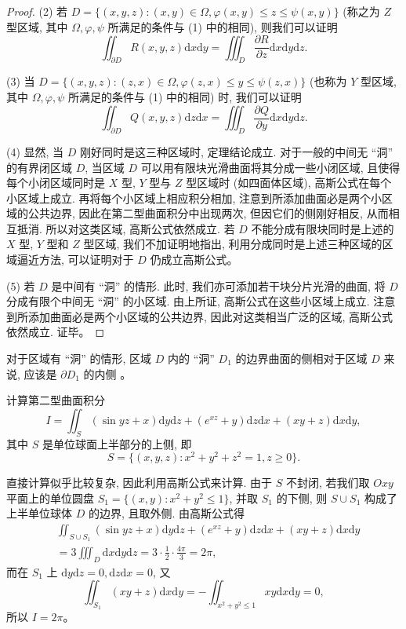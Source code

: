 \documentclass[12pt,fontset=fandol]{ctexart}
\begin{document}
\begin{proof}
(2) 若 $D=\{(x,y,z):(x,y)\in\Omega,\varphi(x,y)\leqslant z\leqslant\psi(x,y)\}$ (称之为 $Z$ 型区域, 其中 $\Omega,\varphi,\psi$ 所满足的条件与 (1) 中的相同), 则我们可以证明
\[
  \iint_{\partial D}R(x,y,z)\mathrm dx\mathrm dy
  =\iiint_D\frac{\partial R}{\partial z}\mathrm dx\mathrm dy\mathrm dz.
\]

(3) 当 $D=\{(x,y,z):(z,x)\in\Omega,\varphi(z,x)\leqslant y\leqslant\psi(z,x)\}$ (也称为 $Y$ 型区域, 其中 $\Omega,\varphi,\psi$ 所满足的条件与 (1) 中的相同) 时, 我们可以证明
\[
  \iint_{\partial D}Q(x,y,z)\mathrm dz\mathrm dx
  =\iiint_D\frac{\partial Q}{\partial y}\mathrm dx\mathrm dy\mathrm dz.
\]

(4) 显然, 当 $D$ 刚好同时是这三种区域时, 定理结论成立. 对于一般的中间无 ``洞'' 的有界闭区域 $D$, 当区域 $D$ 可以用有限块光滑曲面将其分成一些小闭区域, 且使得每个小闭区域同时是 $X$ 型, $Y$ 型与 $Z$ 型区域时 (如四面体区域), 高斯公式在每个小区域上成立. 再将每个小区域上相应积分相加, 注意到所添加曲面必是两个小区域的公共边界, 因此在第二型曲面积分中出现两次, 但因它们的侧刚好相反, 从而相互抵消. 所以对这类区域, 高斯公式依然成立. 若 $D$ 不能分成有限块同时是上述的 $X$ 型, $Y$ 型和 $Z$ 型区域, 我们不加证明地指出, 利用分成同时是上述三种区域的区域逼近方法, 可以证明对于 $D$ 仍成立高斯公式。

(5) 若 $D$ 是中间有 ``洞'' 的情形. 此时, 我们亦可添加若干块分片光滑的曲面, 将 $D$ 分成有限个中间无 ``洞'' 的小区域. 由上所证, 高斯公式在这些小区域上成立. 注意到所添加曲面必是两个小区域的公共边界, 因此对这类相当广泛的区域, 高斯公式依然成立. 证毕。

\end{proof}
\begin{remark}\quad 对于区域有 ``洞'' 的情形, 区域 $D$ 内的 ``洞'' $D_1$ 的边界曲面的侧相对于区域 $D$ 来说, 应该是 $\partial D_1$ 的内侧 。

\end{remark}
\begin{example}\label{course-example-16-5-3}\quad 计算第二型曲面积分
\[
  I=\iint_S(\sin yz+x)\mathrm dy\mathrm dz+(e^{xz}+y)\mathrm dz\mathrm dx+(xy+z)\mathrm dx\mathrm dy,
\]
其中 $S$ 是单位球面上半部分的上侧, 即
\[
  S=\{(x,y,z):x^2+y^2+z^2=1,z\geqslant0\}.
\]

\end{example}
\begin{solve}\quad 直接计算似乎比较复杂, 因此利用高斯公式来计算. 由于 $S$ 不封闭, 若我们取 $Oxy$ 平面上的单位圆盘 $S_1=\{(x,y):x^2+y^2\leqslant1\}$, 并取 $S_1$ 的下侧, 则 $S\cup S_1$ 构成了上半单位球体 $D$ 的边界, 且取外侧. 由高斯公式得
\[
\begin{aligned}
  &\iint_{S\cup S_1}(\sin yz+x)\mathrm dy\mathrm dz+(e^{xz}+y)\mathrm dz\mathrm dx+(xy+z)\mathrm dx\mathrm dy\\
  &=3\iiint_D\mathrm dx\mathrm dy\mathrm dz
    =3\cdot\frac12\cdot\frac{4\pi}{3}=2\pi,
\end{aligned}
\]
而在 $S_1$ 上 $\mathrm dy\mathrm dz=0,\mathrm dz\mathrm dx=0$, 又
\[
  \iint_{S_1}(xy+z)\mathrm dx\mathrm dy
  =-\iint_{x^2+y^2\leqslant1}xy\mathrm dx\mathrm dy=0,
\]
所以 $I=2\pi$。

\end{solve}
\end{document}
